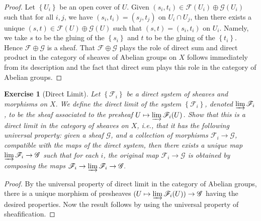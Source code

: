 \documentclass{amsart}
\newtheorem{exe}{Exercise}[subsection]
\theoremstyle{remark}\newtheorem{rmk}[theorem]{Remark}
\begin{document}
\begin{proof}
               Let $\left\{U_{i}\right\}$ be an open cover of $U$. Given $\left(s_{i}, t_{i}\right) \in \mathscr{F}\left(U_{i}\right) \oplus \mathscr{G}\left(U_{i}\right)$ such that for all $i, j$, we have $\left(s_{i}, t_{i}\right)=\left(s_{j}, t_{j}\right)$ on $U_{i} \cap U_{j}$, then there exists a unique $(s, t) \in \mathscr{F}(U) \oplus \mathscr{G}(U)$ such that $(s, t)=\left(s_{i}, t_{i}\right)$ on $U_{i} .$ Namely, we take $s$ to be the gluing of the $\left\{s_{i}\right\}$ and $t$ to be the gluing of the $\left\{t_{i}\right\} .$ Hence $\mathscr{F} \oplus \mathscr{G}$ is a sheaf.    
               That $\mathscr{F} \oplus \mathscr{G}$ plays the role of direct sum and direct product in the category of sheaves of Abelian groups on $X$ follows immediately from its description and the fact that direct sum plays this role in the category of Abelian groups.
\end{proof}

\begin{exe}[Direct Limit]
	\label{2.1.10}
               Let $\left\{\mathscr{F}_{i}\right\}$ be a direct system of sheaves and morphisms on $X .$ We define the direct limit of the system $\left\{\mathscr{F}_{i}\right\}$, denoted $\varinjlim\mathscr{F}_{i}$, to be the sheaf associated to the presheaf $U \mapsto \varinjlim \mathscr{F}_{i}(U)$. Show that this is a direct limit in the category of sheaves on $X$, i.e., that it has the following universal property: given a sheaf $\mathscr{G}$, and a collection of morphisms $\mathscr{F}_{i} \rightarrow \mathscr{G}$, compatible with the maps of the direct
system, then there exists a unique map $\varinjlim \mathscr{F}_{i} \rightarrow \mathscr{G}$ such that for each $i$, the original map $\mathscr{F}_{i} \rightarrow \mathscr{G}$ is obtained by composing the maps $\mathscr{F}_{i} \rightarrow \varinjlim \mathscr{F}_{i} \rightarrow \mathscr{G} .$
\end{exe}

\begin{proof}
               By the universal property of direct limit in the category of Abelian groups, there is a unique morphism of presheaves $(U\mapsto\varinjlim \mathscr{F}_{i}(U))\rightarrow\mathscr{G}$ having the desired properties. Now the result follows by using the universal property of sheafification.
\end{proof}
\end{document}
